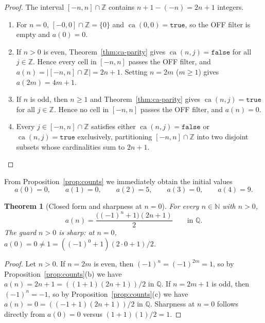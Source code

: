 \documentclass[11pt]{article}
\newtheorem{theorem}{Theorem}[section]
\theoremstyle{definition}
\newcommand{\N}{\mathbb{N}}
\newcommand{\Z}{\mathbb{Z}}
\newcommand{\Q}{\mathbb{Q}}
\newcommand{\ca}{\operatorname{ca}}
\begin{document}
\begin{proof}
The interval $[-n, n] \cap \Z$ contains $n + 1 - (-n) = 2n + 1$ integers.
\begin{enumerate}
\item[\textup{(a)}] For $n = 0$, $[-0, 0] \cap \Z = \{0\}$ and $\ca(0, 0) = \mathtt{true}$, so the OFF filter is empty and $a(0) = 0$.
\item[\textup{(b)}] If $n > 0$ is even, Theorem~\ref{thm:ca-parity} gives $\ca(n, j) = \mathtt{false}$ for all $j \in \Z$. Hence every cell in $[-n, n]$ passes the OFF filter, and $a(n) = |[-n, n] \cap \Z| = 2n + 1$. Setting $n = 2m$ ($m \ge 1$) gives $a(2m) = 4m + 1$.
\item[\textup{(c)}] If $n$ is odd, then $n \ge 1$ and Theorem~\ref{thm:ca-parity} gives $\ca(n, j) = \mathtt{true}$ for all $j \in \Z$. Hence no cell in $[-n, n]$ passes the OFF filter, and $a(n) = 0$.
\item[\textup{(d)}] Every $j \in [-n, n] \cap \Z$ satisfies either $\ca(n, j) = \mathtt{false}$ or $\ca(n, j) = \mathtt{true}$ exclusively, partitioning $[-n, n] \cap \Z$ into two disjoint subsets whose cardinalities sum to $2n + 1$. \qedhere
\end{enumerate}
\end{proof}

From Proposition~\ref{prop:counts} we immediately obtain the initial values
\begin{equation}
\label{eq:init-vals}
a(0) = 0, \qquad a(1) = 0, \qquad a(2) = 5, \qquad a(3) = 0, \qquad a(4) = 9.
\end{equation}

\begin{theorem}[Closed form and sharpness at $n = 0$]
\label{thm:closed-form}
For every $n \in \N$ with $n > 0$,
\[
a(n) = \frac{\bigl((-1)^n + 1\bigr)(2n + 1)}{2} \qquad \text{in }\Q.
\]
The guard $n > 0$ is sharp: at $n = 0$, $a(0) = 0 \ne 1 = ((-1)^0 + 1)(2\cdot 0 + 1)/2$.
\end{theorem}

\begin{proof}
Let $n > 0$. If $n = 2m$ is even, then $(-1)^n = (-1)^{2m} = 1$, so by Proposition~\ref{prop:counts}(b) we have $a(n) = 2n + 1 = ((1 + 1)(2n + 1))/2$ in $\Q$. If $n = 2m + 1$ is odd, then $(-1)^n = -1$, so by Proposition~\ref{prop:counts}(c) we have $a(n) = 0 = ((-1 + 1)(2n + 1))/2$ in $\Q$. Sharpness at $n = 0$ follows directly from $a(0) = 0$ versus $(1 + 1)(1)/2 = 1$.
\end{proof}
\end{document}

